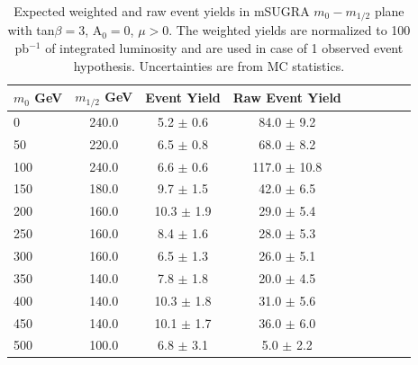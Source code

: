 \vspace{10 mm}
\begin{table}[hbt]
\begin{center}
\renewcommand{\arraystretch}{2.0}
 {\footnotesize
\begin{tabular}{|l|c|c|c|c|c|c|c|c|}\hline
$m_{0}$ GeV & $m_{1/2}$ GeV & Event Yield & Raw Event Yield \\ \hline
0 & 240.0 & 5.2 $\pm$ 0.6 & 84.0 $\pm$ 9.2 \\ 
50 & 220.0 & 6.5 $\pm$ 0.8 & 68.0 $\pm$ 8.2 \\ 
100 & 240.0 & 6.6 $\pm$ 0.6 & 117.0 $\pm$ 10.8 \\ 
150 & 180.0 & 9.7 $\pm$ 1.5 & 42.0 $\pm$ 6.5 \\ 
200 & 160.0 & 10.3 $\pm$ 1.9 & 29.0 $\pm$ 5.4 \\ 
250 & 160.0 & 8.4 $\pm$ 1.6 & 28.0 $\pm$ 5.3 \\ 
300 & 160.0 & 6.5 $\pm$ 1.3 & 26.0 $\pm$ 5.1 \\ 
350 & 140.0 & 7.8 $\pm$ 1.8 & 20.0 $\pm$ 4.5 \\ 
400 & 140.0 & 10.3 $\pm$ 1.8 & 31.0 $\pm$ 5.6 \\ 
450 & 140.0 & 10.1 $\pm$ 1.7 & 36.0 $\pm$ 6.0 \\ 
500 & 100.0 & 6.8 $\pm$ 3.1 & 5.0 $\pm$ 2.2 \\ \hline
\end{tabular} }
\caption{Expected weighted and raw event yields in mSUGRA $m_{0}-m_{1/2}$ plane with tan$\beta = 3$, A$_0 = 0$, $\mu > 0$. The weighted yields are normalized to 100 pb$^{-1}$ of integrated luminosity and are used in case of 1 observed event hypothesis. Uncertainties are from MC statistics. \label{tab:ssyields_ex1}}
\end{center}
\end{table}

